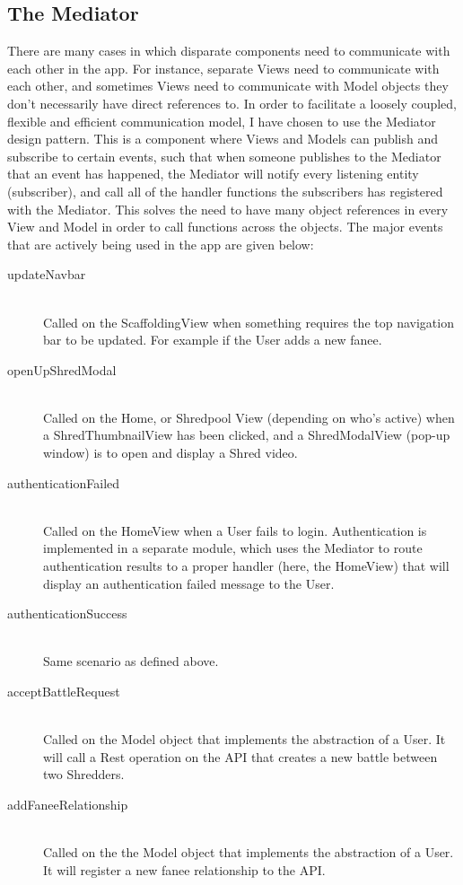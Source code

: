 \subsection{The Mediator}
There are many cases in which disparate components need to communicate with each other in the app. For instance, separate Views need to communicate with each other, and sometimes Views need to communicate with Model objects they don't necessarily have direct references to. In order to facilitate a loosely coupled, flexible and efficient communication model, I have chosen to use the Mediator design pattern. This is a component where Views and Models can publish and subscribe to certain events, such that when someone publishes to the Mediator that an event has happened, the Mediator will notify every listening entity (subscriber), and call all of the handler functions the subscribers has registered with the Mediator. This solves the need to have many object references in every View and Model in order to call functions across the objects. The major events that are actively being used in the app are given below:

\begin{description}
  \item[updateNavbar] \hfill \\
  Called on the ScaffoldingView when something requires the top navigation bar to be updated. For example if the User adds a new fanee.
  
  \item[openUpShredModal] \hfill \\
 Called on the Home, or Shredpool View (depending on who's active) when a ShredThumbnailView has been clicked, and a ShredModalView (pop-up window) is to open and display a Shred video.  
 
  \item[authenticationFailed] \hfill \\
Called on the HomeView when a User fails to login. Authentication is implemented in a separate module, which uses the Mediator to route authentication results to a proper handler (here, the HomeView) that will display an authentication failed message to  the User.

  \item[authenticationSuccess] \hfill \\
 Same scenario as defined above.
 
  \item[acceptBattleRequest] \hfill \\
 Called on the Model object that implements the abstraction of a User. It will call a Rest operation on the API that creates a new battle between two Shredders.
   
  \item[addFaneeRelationship] \hfill \\
 Called on the the Model object that implements the abstraction of a User. It will register a new fanee relationship to the API.

\end{description}

